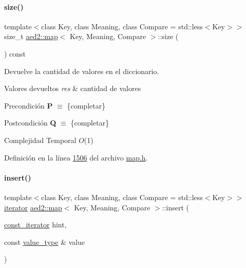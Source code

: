 \paragraph{\texorpdfstring{size()}{size()}}
{\footnotesize\ttfamily template$<$class Key, class Meaning, class Compare = std\+::less$<$\+Key$>$$>$ \\
size\+\_\+t \hyperlink{classaed2_1_1map}{aed2\+::map}$<$ Key, Meaning, Compare $>$\+::size (\begin{DoxyParamCaption}{ }\end{DoxyParamCaption}) const\hspace{0.3cm}{\ttfamily [inline]}}



Devuelve la cantidad de valores en el diccionario. 


\begin{DoxyRetVals}{Valores devueltos}
{\em res} & cantidad de valores\\
\hline
\end{DoxyRetVals}
\begin{DoxyPrecond}{Precondición}
{\bfseries P} $\equiv$ \{completar\} 
\end{DoxyPrecond}
\begin{DoxyPostcond}{Postcondición}
{\bfseries Q} $\equiv$ \{completar\}
\end{DoxyPostcond}

\begin{DoxyDescription}
\item[Complejidad Temporal]$O$(1)
\end{DoxyDescription}

Definición en la línea \hyperlink{map_8h_source_l01506}{1506} del archivo \hyperlink{map_8h_source}{map.\+h}.

\mbox{\label{classaed2_1_1map_a6941cde9a79c27f054b5c97a587a1854_a6941cde9a79c27f054b5c97a587a1854}} 
\paragraph{\texorpdfstring{insert()}{insert()}\hspace{0.1cm}{\footnotesize\ttfamily [1/2]}}
{\footnotesize\ttfamily template$<$class Key, class Meaning, class Compare = std\+::less$<$\+Key$>$$>$ \\
\hyperlink{classaed2_1_1map_1_1iterator}{iterator} \hyperlink{classaed2_1_1map}{aed2\+::map}$<$ Key, Meaning, Compare $>$\+::insert (\begin{DoxyParamCaption}\item[{\hyperlink{classaed2_1_1map_1_1const__iterator}{const\+\_\+iterator}}]{hint,  }\item[{const \hyperlink{classaed2_1_1map_a719db98e0ff9a837610f76be33264680_a719db98e0ff9a837610f76be33264680}{value\+\_\+type} \&}]{value }\end{DoxyParamCaption})\hspace{0.3cm}{\ttfamily [inline]}}



